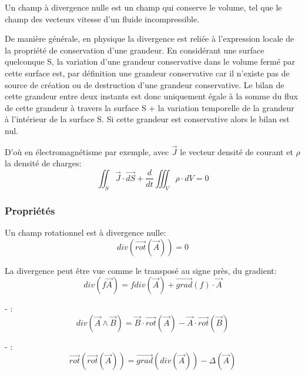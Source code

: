 \documentclass[10pt,a4paper]{article}
\begin{document}
Un champ à divergence nulle est un champ qui conserve le volume, tel que le champ des vecteurs vitesse d'un fluide incompressible.

De manière générale, en physique la divergence est reliée à l'expression locale de la propriété de conservation d'une grandeur. En considérant une surface quelconque S, la variation d'une grandeur conservative dans le volume fermé par cette surface est, par définition une grandeur conservative car il n'existe pas de source de création ou de destruction d'une grandeur conservative. Le bilan de cette grandeur entre deux instants est donc uniquement égale à la somme du flux de cette grandeur à travers la surface S + la variation temporelle de la grandeur à l'intérieur de la surface S. Si cette grandeur est conservative alors le bilan est nul. 

D'où en électromagnétisme par exemple, avec $\overrightarrow{J}$ le vecteur densité de courant et $\rho$ la densité de charges:
\begin{equation}
\iint_{S}\overrightarrow{J}\cdot \overrightarrow{dS} + \frac{d}{dt}\iiint_{V}\rho\cdot dV = 0
\end{equation}


\subsubsection{Propriétés}
Un champ rotationnel est à divergence nulle:
\begin{equation}
div(\overrightarrow{rot}(\overrightarrow{A})) = 0
\label{divrot}
\end{equation}

La divergence peut être vue comme le transposé au signe près, du gradient:
\begin{equation}
div(f\overrightarrow{A}) = f div(\overrightarrow{A}) + \overrightarrow{grad}(f) \cdot \overrightarrow{A}
\end{equation}

- :
\begin{equation}
div(\overrightarrow{A} \land \overrightarrow{B}) = \overrightarrow{B} \cdot \overrightarrow{rot}(\overrightarrow{A}) - \overrightarrow{A} \cdot \overrightarrow{rot}(\overrightarrow{B})
\end{equation}

- :
\begin{equation}
\overrightarrow{rot}(\overrightarrow{rot}(\overrightarrow{A})) = \overrightarrow{grad}(div(\overrightarrow{A})) - \Delta(\overrightarrow{A})
\end{equation}
\end{document}
